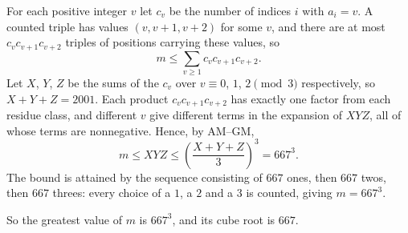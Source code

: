 For each positive integer $v$ let $c_v$ be the number of indices $i$ with $a_i=v$. A counted triple has values $(v,v+1,v+2)$ for some $v$, and there are at most $c_vc_{v+1}c_{v+2}$ triples of positions carrying these values, so
\[m\le\sum_{v\ge1}c_vc_{v+1}c_{v+2}.\]
Let $X$, $Y$, $Z$ be the sums of the $c_v$ over $v\equiv0$, $1$, $2\pmod 3$ respectively, so $X+Y+Z=2001$. Each product $c_vc_{v+1}c_{v+2}$ has exactly one factor from each residue class, and different $v$ give different terms in the expansion of $XYZ$, all of whose terms are nonnegative. Hence, by AM--GM,
\[m\le XYZ\le\left(\dfrac{X+Y+Z}{3}\right)^3=667^3.\]
The bound is attained by the sequence consisting of $667$ ones, then $667$ twos, then $667$ threes: every choice of a $1$, a $2$ and a $3$ is counted, giving $m=667^3$.

So the greatest value of $m$ is $667^3$, and its cube root is $\boxed{667}$.
